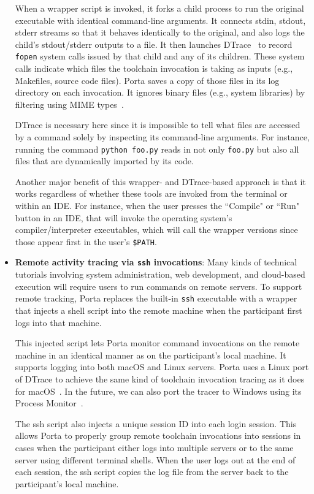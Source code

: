 \begin{itemize}
    When a wrapper script is invoked, it forks a child process to run
    the original executable with identical command-line arguments. It connects
    stdin, stdout, stderr streams so that it behaves identically to the original,
    and also logs the child's stdout/stderr outputs to a file.
    It then launches DTrace~\cite{Cantrill2004} to record \texttt{fopen}
    system calls issued by that child and any of its children. These
    system calls indicate which files the toolchain invocation is taking
    as inputs (e.g., Makefiles, source code files). Porta saves a copy
    of those files in its log directory on each invocation. It ignores
    binary files (e.g., system libraries) by filtering using MIME types~\cite{mime}.

    DTrace is necessary here since it is impossible to tell what files
    are accessed by a command solely by inspecting its command-line
    arguments. For instance, running the command \texttt{python
    foo.py} reads in not only \texttt{foo.py} but also all files that
    are dynamically imported by its code.

    Another major benefit of this wrapper- and DTrace-based
    approach is that it works regardless of whether these
    tools are invoked from the terminal or within an IDE. For instance,
    when the user presses the ``Compile" or ``Run" button in an IDE, that will invoke the operating
    system's compiler/interpreter executables, which will call the
    wrapper versions since those appear first in the user's
    \texttt{\$PATH}.

    \item \textbf{Remote activity tracing via \texttt{ssh} invocations}:
    Many kinds of technical tutorials involving system administration,
    web development, and cloud-based execution will require users to run
    commands on remote servers. To support remote tracking, Porta
    replaces the built-in \texttt{ssh} executable with a wrapper that
    injects a shell script into the remote machine when the participant
    first logs into that machine.

    This injected script lets Porta monitor command invocations on the
    remote machine in an identical manner as on the participant's local
    machine. It supports logging into both macOS and Linux servers.
    Porta uses a Linux port of
    DTrace to achieve the same kind of toolchain invocation
    tracing as it does for macOS~\cite{dtrace4linux}. In the future, we can also port the
    tracer to Windows using its Process Monitor~\cite{procmon}.

    The ssh script also injects a unique session ID into each login
    session. This allows Porta to properly group remote toolchain
    invocations into sessions in cases when the participant either logs
    into multiple servers or to the same server using different terminal
    shells. When the user logs out at the end of each session, the ssh
    script copies the log file from the server back to the participant's
    local machine.

\end{itemize}

